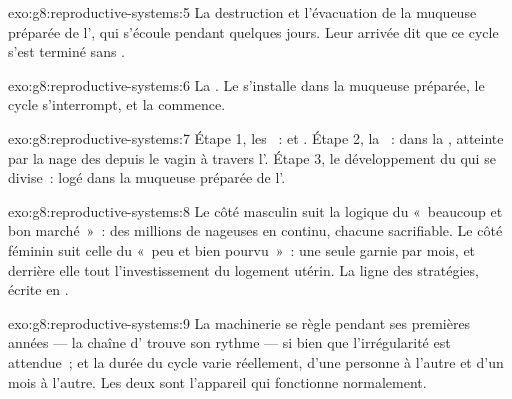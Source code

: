 \begin{solution}{exo:g8:reproductive-systems:5}
La destruction et l'évacuation de la muqueuse préparée de l',
qui s'écoule pendant quelques jours. Leur arrivée dit que ce cycle
s'est terminé sans .
\end{solution}

\begin{solution}{exo:g8:reproductive-systems:6}
La . Le  s'installe dans la muqueuse préparée, le
cycle s'interrompt, et la  commence.
\end{solution}

\begin{solution}{exo:g8:reproductive-systems:7}
Étape 1, les ~:  et . Étape 2, la
~: dans la , atteinte par la nage des  depuis le vagin à travers l'. Étape 3, le développement
du  qui se divise~: logé dans la muqueuse préparée de
l'.
\end{solution}

\begin{solution}{exo:g8:reproductive-systems:8}
Le côté masculin suit la logique du «~beaucoup et bon marché~»~: des
millions de nageuses en continu, chacune sacrifiable. Le côté
féminin suit celle du «~peu et bien pourvu~»~: une seule 
garnie par mois, et derrière elle tout l'investissement du logement
utérin. La ligne des stratégies, écrite en .
\end{solution}

\begin{solution}{exo:g8:reproductive-systems:9}
La machinerie se règle pendant ses premières années --- la chaîne
d' trouve son rythme --- si bien que l'irrégularité est
attendue~; et la durée du cycle varie réellement, d'une personne à
l'autre et d'un mois à l'autre. Les deux sont l'appareil qui
fonctionne normalement.
\end{solution}

